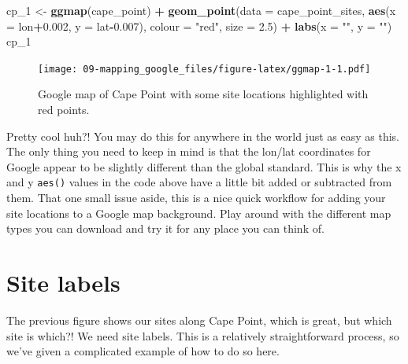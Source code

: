 \documentclass[]{book}
\newenvironment{Shaded}{\begin{snugshade}}{\end{snugshade}}
\newcommand{\KeywordTok}[1]{\textcolor[rgb]{0.13,0.29,0.53}{\textbf{#1}}}
\newcommand{\DataTypeTok}[1]{\textcolor[rgb]{0.13,0.29,0.53}{#1}}
\newcommand{\DecValTok}[1]{\textcolor[rgb]{0.00,0.00,0.81}{#1}}
\newcommand{\FloatTok}[1]{\textcolor[rgb]{0.00,0.00,0.81}{#1}}
\newcommand{\StringTok}[1]{\textcolor[rgb]{0.31,0.60,0.02}{#1}}
\newcommand{\OperatorTok}[1]{\textcolor[rgb]{0.81,0.36,0.00}{\textbf{#1}}}
\newcommand{\NormalTok}[1]{#1}
\theoremstyle{definition}
\theoremstyle{definition}
\theoremstyle{definition}
\theoremstyle{remark}
\begin{document}
\begin{Shaded}
\begin{Highlighting}[]
\NormalTok{cp_}\DecValTok{1}\NormalTok{ <-}\StringTok{ }\KeywordTok{ggmap}\NormalTok{(cape_point) }\OperatorTok{+}
\StringTok{  }\KeywordTok{geom_point}\NormalTok{(}\DataTypeTok{data =}\NormalTok{ cape_point_sites, }\KeywordTok{aes}\NormalTok{(}\DataTypeTok{x =}\NormalTok{ lon}\OperatorTok{+}\FloatTok{0.002}\NormalTok{, }\DataTypeTok{y =}\NormalTok{ lat}\OperatorTok{-}\FloatTok{0.007}\NormalTok{), }
             \DataTypeTok{colour =} \StringTok{"red"}\NormalTok{, }\DataTypeTok{size =}  \FloatTok{2.5}\NormalTok{) }\OperatorTok{+}
\StringTok{  }\KeywordTok{labs}\NormalTok{(}\DataTypeTok{x =} \StringTok{""}\NormalTok{, }\DataTypeTok{y =} \StringTok{""}\NormalTok{)}
\NormalTok{cp_}\DecValTok{1}
\end{Highlighting}
\end{Shaded}

\begin{figure}
\centering
\texttt{[image: 09-mapping\_google\_files/figure-latex/ggmap-1-1.pdf]}
\caption{\label{fig:ggmap-1}Google map of Cape Point with some site
locations highlighted with red points.}
\end{figure}

Pretty cool huh?! You may do this for anywhere in the world just as easy
as this. The only thing you need to keep in mind is that the lon/lat
coordinates for Google appear to be slightly different than the global
standard. This is why the x and y \texttt{aes()} values in the code
above have a little bit added or subtracted from them. That one small
issue aside, this is a nice quick workflow for adding your site
locations to a Google map background. Play around with the different map
types you can download and try it for any place you can think of.

\section{Site labels}\label{site-labels}

The previous figure shows our sites along Cape Point, which is great,
but which site is which?! We need site labels. This is a relatively
straightforward process, so we've given a complicated example of how to
do so here.
\end{document}
